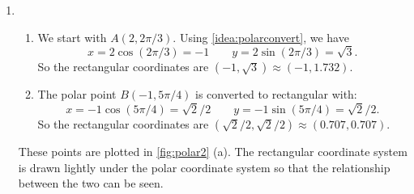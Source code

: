 {\begin{enumerate}
	\item \begin{enumerate}
		\item 
	We start with $A(2,2\pi/3)$. Using \autoref{idea:polarconvert}, we have 
	\[x= 2\cos (2\pi/3) = -1\qquad y = 2\sin (2\pi/3) = \sqrt{3}.\]
	So the rectangular coordinates are $(-1,\sqrt{3}) \approx (-1,1.732)$.
	
	\item The polar point $B(-1,5\pi/4)$ is converted to rectangular with:
	\[x=-1\cos (5\pi/4) = \sqrt{2}/2\qquad y= -1\sin (5\pi/4) = \sqrt{2}/2.\]
	So the rectangular coordinates are $(\sqrt{2}/2,\sqrt{2}/2) \approx (0.707,0.707)$.
	\end{enumerate}
	These points are plotted in \autoref{fig:polar2} (a). The rectangular coordinate system is drawn lightly under the polar coordinate system so that the relationship between the two can be seen.
	

\end{enumerate}}
